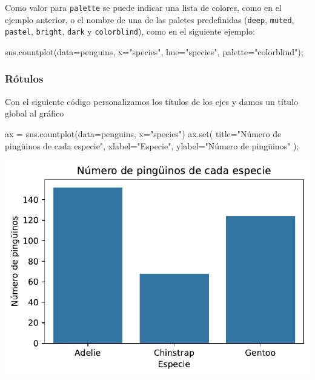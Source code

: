 \documentclass[
  a4paper,
  noprof,
  12pt,
  notoc,
  nosols,
  nobib]{mnye}
\newenvironment{Shaded}{\begin{snugshade}}{\end{snugshade}}
\newcommand{\BuiltInTok}[1]{\textcolor[rgb]{0.00,0.23,0.31}{#1}}
\newcommand{\NormalTok}[1]{\textcolor[rgb]{0.00,0.23,0.31}{#1}}
\newcommand{\OperatorTok}[1]{\textcolor[rgb]{0.37,0.37,0.37}{#1}}
\newcommand{\StringTok}[1]{\textcolor[rgb]{0.13,0.47,0.30}{#1}}
\theoremstyle{definition}
\theoremstyle{remark}
\begin{document}
Como valor para \texttt{palette} se puede indicar una lista de colores,
como en el ejemplo anterior, o el nombre de una de las paletes
predefinidas (\texttt{deep}, \texttt{muted}, \texttt{pastel},
\texttt{bright}, \texttt{dark} y \texttt{colorblind}), como en el
siguiente ejemplo:

\begin{Shaded}
\begin{Highlighting}[]
\NormalTok{sns.countplot(data}\OperatorTok{=}\NormalTok{penguins, x}\OperatorTok{=}\StringTok{"species"}\NormalTok{, hue}\OperatorTok{=}\StringTok{"species"}\NormalTok{, palette}\OperatorTok{=}\StringTok{"colorblind"}\NormalTok{)}\OperatorTok{;}
\end{Highlighting}
\end{Shaded}

\subsubsection{Rótulos}\label{ruxf3tulos}

Con el siguiente código personalizamos los títulos de los ejes y damos
un título global al gráfico

\begin{Shaded}
\begin{Highlighting}[]
\NormalTok{ax }\OperatorTok{=}\NormalTok{ sns.countplot(data}\OperatorTok{=}\NormalTok{penguins, x}\OperatorTok{=}\StringTok{"species"}\NormalTok{)}
\NormalTok{ax.}\BuiltInTok{set}\NormalTok{(}
\NormalTok{    title}\OperatorTok{=}\StringTok{"Número de pingüinos de cada especie"}\NormalTok{,}
\NormalTok{    xlabel}\OperatorTok{=}\StringTok{"Especie"}\NormalTok{, }
\NormalTok{    ylabel}\OperatorTok{=}\StringTok{"Número de pingüinos"}
\NormalTok{)}\OperatorTok{;}
\end{Highlighting}
\end{Shaded}

\begin{center}
\includegraphics{chapters/1categorical_files/figure-pdf/cell-12-output-1.pdf}
\end{center}
\end{document}

